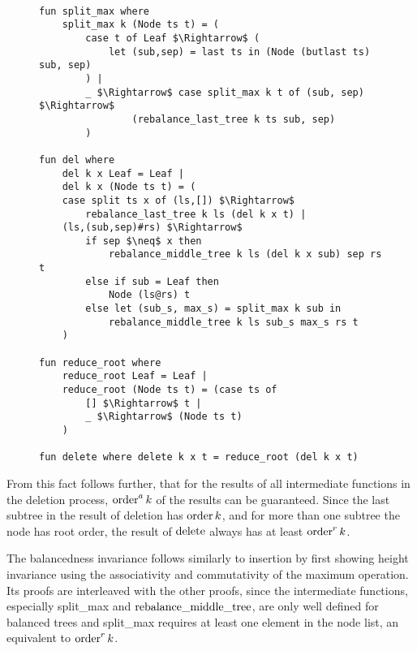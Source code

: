 \begin{figure}
\begin{lstlisting}[mathescape=true, language=Isabelle,label={lst:del-def},
    caption={The $delete$ function}]

fun split_max where
    split_max k (Node ts t) = (
        case t of Leaf $\Rightarrow$ (
            let (sub,sep) = last ts in (Node (butlast ts) sub, sep)
        ) |
        _ $\Rightarrow$ case split_max k t of (sub, sep) $\Rightarrow$
                (rebalance_last_tree k ts sub, sep)
        )

fun del where
    del k x Leaf = Leaf |
    del k x (Node ts t) = (
    case split ts x of (ls,[]) $\Rightarrow$
        rebalance_last_tree k ls (del k x t) |
    (ls,(sub,sep)#rs) $\Rightarrow$
        if sep $\neq$ x then
            rebalance_middle_tree k ls (del k x sub) sep rs t
        else if sub = Leaf then
            Node (ls@rs) t
        else let (sub_s, max_s) = split_max k sub in
            rebalance_middle_tree k ls sub_s max_s rs t
    )
 
fun reduce_root where
    reduce_root Leaf = Leaf |
    reduce_root (Node ts t) = (case ts of
        [] $\Rightarrow$ t |
        _ $\Rightarrow$ (Node ts t)
    )
 
fun delete where delete k x t = reduce_root (del k x t)
\end{lstlisting}
\end{figure}

From this fact follows further, that for the results of all intermediate functions
in the deletion process, $\operatorname{order}^a k$ of the results can be guaranteed.
Since the last subtree in the result of deletion has $\operatorname{order} k$,
and for more than one subtree the node has root order,
the result of $\operatorname{delete}$ always has at least $\operatorname{order}^r k$.

The balancedness invariance follows similarly to
insertion by first showing height invariance %
using the associativity and commutativity of the maximum operation.
Its proofs are interleaved with the other proofs,
since the intermediate functions, especially
split\_max and $\operatorname{rebalance\_middle\_tree}$, are only well defined for balanced trees
and split\_max requires at least one element in the node list, an equivalent
to $\operatorname{order}^r k$.

